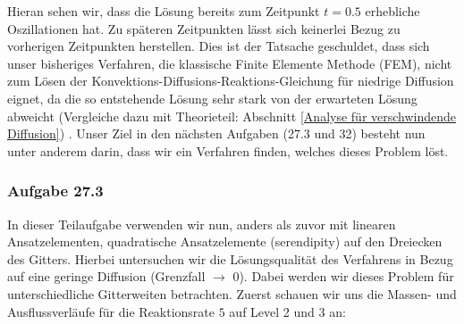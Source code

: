 Hieran sehen wir, dass die Lösung bereits zum Zeitpunkt $t=0.5$
erhebliche Oszillationen hat. Zu späteren Zeitpunkten lässt sich keinerlei Bezug zu vorherigen Zeitpunkten herstellen. Dies ist der Tatsache geschuldet, dass sich unser bisheriges Verfahren, die klassische Finite Elemente Methode (FEM), nicht zum Lösen der Konvektions-Diffusions-Reaktions-Gleichung für niedrige Diffusion eignet, da die so entstehende Lösung sehr stark von der erwarteten Lösung abweicht (Vergleiche dazu mit Theorieteil: Abschnitt \ref{Analyse für verschwindende Diffusion}) .
Unser Ziel in den nächsten Aufgaben (27.3 und 32) besteht nun unter anderem darin, dass wir ein Verfahren finden, welches dieses Problem löst.

\subsubsection{Aufgabe 27.3}
In dieser Teilaufgabe verwenden wir nun, anders als zuvor mit linearen Ansatzelementen, quadratische Ansatzelemente (serendipity) auf den Dreiecken des Gitters. Hierbei untersuchen wir die Lösungsqualität des Verfahrens in Bezug auf eine geringe Diffusion (Grenzfall $\to$ 0). Dabei werden wir dieses Problem für unterschiedliche Gitterweiten betrachten.
Zuerst schauen wir uns die Massen- und Ausflussverläufe für die Reaktionsrate $5$ auf Level 2 und 3 an:
